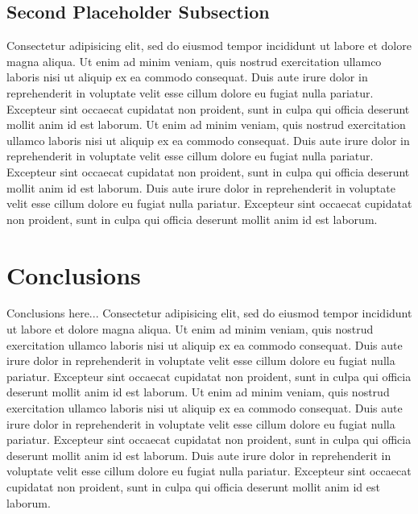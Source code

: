 \documentclass[a4paper]{article}
\begin{document}
\subsection{Second Placeholder Subsection}
Consectetur adipisicing elit, sed do eiusmod tempor incididunt ut labore et
dolore magna aliqua. Ut enim ad minim veniam, quis nostrud exercitation ullamco
laboris nisi ut aliquip ex ea commodo consequat. Duis aute irure dolor in
reprehenderit in voluptate velit esse cillum dolore eu fugiat nulla pariatur.
Excepteur sint occaecat cupidatat non proident, sunt in culpa qui officia
deserunt mollit anim id est laborum. Ut enim ad minim veniam, quis nostrud
exercitation ullamco laboris nisi ut aliquip ex ea commodo consequat. Duis aute
irure dolor in reprehenderit in voluptate velit esse cillum dolore eu fugiat
nulla pariatur. Excepteur sint occaecat cupidatat non proident, sunt in culpa
qui officia deserunt mollit anim id est laborum. Duis aute irure dolor in
reprehenderit in voluptate velit esse cillum dolore eu fugiat nulla pariatur.
Excepteur sint occaecat cupidatat non proident, sunt in culpa qui officia
deserunt mollit anim id est laborum.


\section{Conclusions}
Conclusions here... Consectetur adipisicing elit, sed do eiusmod tempor
incididunt ut labore et dolore magna aliqua. Ut enim ad minim veniam, quis
nostrud exercitation ullamco laboris nisi ut aliquip ex ea commodo consequat.
Duis aute irure dolor in reprehenderit in voluptate velit esse cillum dolore eu
fugiat nulla pariatur. Excepteur sint occaecat cupidatat non proident, sunt in
culpa qui officia deserunt mollit anim id est laborum. Ut enim ad minim veniam,
quis nostrud exercitation ullamco laboris nisi ut aliquip ex ea commodo
consequat. Duis aute irure dolor in reprehenderit in voluptate velit esse
cillum dolore eu fugiat nulla pariatur. Excepteur sint occaecat cupidatat non
proident, sunt in culpa qui officia deserunt mollit anim id est laborum. Duis
aute irure dolor in reprehenderit in voluptate velit esse cillum dolore eu
fugiat nulla pariatur. Excepteur sint occaecat cupidatat non proident, sunt in
culpa qui officia deserunt mollit anim id est laborum.




\end{document}
